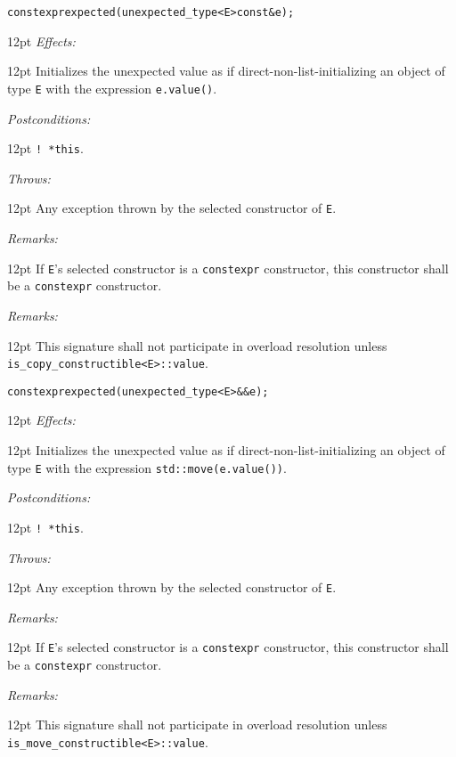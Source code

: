 \documentclass[a4paper,10pt]{article}
\newcommand{\cpp}[1]{\lstinline{#1}}
\newcommand{\wordingItem}[1]{\noindent\textit{#1:}}
\newenvironment{wordingTextItem}[1]{\wordingItem{#1}\vspace{2pt}\noindent\begin{adjustwidth}{12pt}{}}{\vspace{2pt}\end{adjustwidth}}
\newenvironment{wordingPara}{\begin{adjustwidth}{12pt}{}}{\end{adjustwidth}}
\begin{document}
\begin{alltt}
constexpr expected(unexpected_type<E> const& e);
\end{alltt}
\begin{wordingPara}
\begin{wordingTextItem}{Effects}
Initializes the unexpected value as if direct-non-list-initializing an object of type \cpp{E} with the expression \cpp{e.value()}.
\end{wordingTextItem}
\begin{wordingTextItem}{Postconditions}
\cpp{! *this}.
\end{wordingTextItem}
\begin{wordingTextItem}{Throws}
Any exception thrown by the selected constructor of \cpp{E}.
\end{wordingTextItem}
\begin{wordingTextItem}{Remarks}
If \cpp{E}'s selected constructor is a \cpp{constexpr} constructor, this constructor shall be a \cpp{constexpr} constructor.
\end{wordingTextItem}
\begin{wordingTextItem}{Remarks}
This signature shall not participate in overload resolution unless\\
\cpp{is_copy_constructible<E>::value}. 
\end{wordingTextItem}
\end{wordingPara}

\begin{alltt}
constexpr expected(unexpected_type<E>&& e); 
\end{alltt}
\begin{wordingPara}
\begin{wordingTextItem}{Effects}
Initializes the unexpected value as if direct-non-list-initializing an object of type \cpp{E} with the expression \cpp{std::move(e.value())}.
\end{wordingTextItem}
\begin{wordingTextItem}{Postconditions}
\cpp{! *this}.
\end{wordingTextItem}
\begin{wordingTextItem}{Throws}
Any exception thrown by the selected constructor of \cpp{E}.
\end{wordingTextItem}
\begin{wordingTextItem}{Remarks}
If \cpp{E}'s selected constructor is a \cpp{constexpr} constructor, this constructor shall be a \cpp{constexpr} constructor.
\end{wordingTextItem}
\begin{wordingTextItem}{Remarks}
This signature shall not participate in overload resolution unless\\
\cpp{is_move_constructible<E>::value}.
\end{wordingTextItem}
\end{wordingPara}
\end{document}
